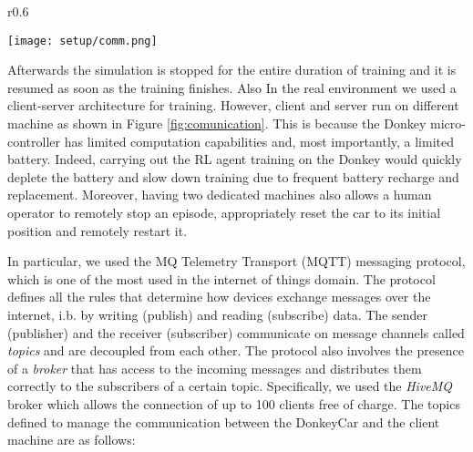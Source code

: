 \begin{wrapfigure}{r}{0.6\textwidth}
	\begin{center}
		\texttt{[image: setup/comm.png]}
	  \end{center}
	  \caption{Key steps in the real training procedures}
	  \label{fig:comunication}
\end{wrapfigure}

Afterwards the simulation is stopped for the entire duration of training and it is resumed as soon as the training finishes. Also In the real environment we used a client-server architecture for training. However, client and server run on different machine as shown in Figure \ref{fig:comunication}. This is because the Donkey micro-controller has limited computation capabilities and, most importantly, a limited battery. Indeed, carrying out the RL agent training on the Donkey would quickly deplete the battery and slow down training due to frequent battery recharge and replacement. Moreover, having two dedicated machines also allows a human operator to remotely stop an episode, appropriately reset the car to its initial position and remotely restart it.

In particular, we used the MQ Telemetry Transport (MQTT) messaging protocol, which is one of the most used in the internet of things domain. The protocol defines all the rules that determine how devices exchange messages over the internet, i.b. by writing (publish) and reading (subscribe) data. The sender (publisher) and the receiver (subscriber) communicate on message channels called \textit{topics} and are decoupled from each other. The protocol also involves the presence of a \textit{broker} that has access to the incoming messages and distributes them correctly to the subscribers of a certain topic. Specifically, we used the \textit{HiveMQ} broker which allows the connection of up to 100 clients free of charge. The topics defined to manage the communication between the DonkeyCar and the client machine are as follows:

